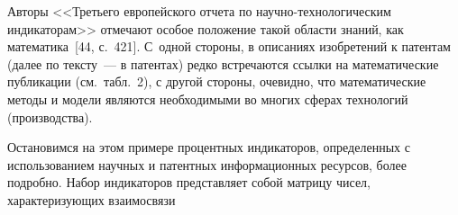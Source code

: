 \begin{multicols}{2}
  Авторы <<Третьего европейского отчета по на\-уч\-но-тех\-но\-ло\-ги\-че\-ским 
индикаторам>> отмечают особое положение такой области знаний, как математика~[44, с.~421]. 
С~одной стороны, в описаниях изобретений к патентам (далее по тексту~--- в патентах) редко 
встречаются ссылки на математические публикации (см.\ табл.~2), с другой стороны, очевидно, 
что математические методы и модели являются необходимыми во многих сферах технологий 
(производства).


   
  Остановимся на этом примере процентных индикаторов, определенных с использованием 
научных и патентных информационных ресурсов, более подробно. Набор индикаторов 
представляет собой матрицу чисел, характеризующих взаимосвязи\linebreak\vspace*{-12pt}

\pagebreak


\end{multicols}

